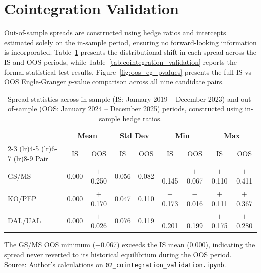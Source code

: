 \documentclass[a4paper]{report}
\begin{document}
\FloatBarrier

\section{Cointegration Validation}

Out-of-sample spreads are constructed using hedge ratios and intercepts
estimated solely on the in-sample period, ensuring no forward-looking
information is incorporated. Table~\ref{tab:oos_spread_stats} presents
the distributional shift in each spread across the IS and OOS periods,
while Table~\ref{tab:cointegration_validation} reports the formal
statistical test results. Figure~\ref{fig:oos_eg_pvalues} presents
the full IS vs OOS Engle-Granger $p$-value comparison across all
nine candidate pairs.

\begin{table}[htbp]
\centering
\caption{Spread statistics across in-sample (IS: January 2019 -- December 2023) and out-of-sample (OOS: January 2024 -- December 2025) periods, constructed using in-sample hedge ratios.\\}
\label{tab:oos_spread_stats}
\begin{tabular}{lcccccccc}
\toprule
& \multicolumn{2}{c}{Mean} & \multicolumn{2}{c}{Std Dev} & \multicolumn{2}{c}{Min} & \multicolumn{2}{c}{Max} \\
\cmidrule(lr){2-3} \cmidrule(lr){4-5} \cmidrule(lr){6-7} \cmidrule(lr){8-9}
Pair & IS & OOS & IS & OOS & IS & OOS & IS & OOS \\
\midrule
GS/MS   & 0.000 & $+$0.250 & 0.056 & 0.082 & $-$0.145 & $+$0.067 & $+$0.110 & $+$0.411 \\
KO/PEP  & 0.000 & $+$0.170 & 0.047 & 0.110 & $-$0.173 & $-$0.016 & $+$0.111 & $+$0.367 \\
DAL/UAL & 0.000 & $+$0.026 & 0.076 & 0.119 & $-$0.201 & $-$0.199 & $+$0.175 & $+$0.280 \\
\bottomrule
\end{tabular}

\par\smallskip
\begin{minipage}{\linewidth}
\small
The GS/MS OOS minimum (+0.067) exceeds the IS mean (0.000), indicating the spread never reverted to its historical equilibrium during the OOS period. \\
Source: Author's calculations on \texttt{02\_cointegration\_validation.ipynb}.
\end{minipage}
\end{table}
\end{document}
